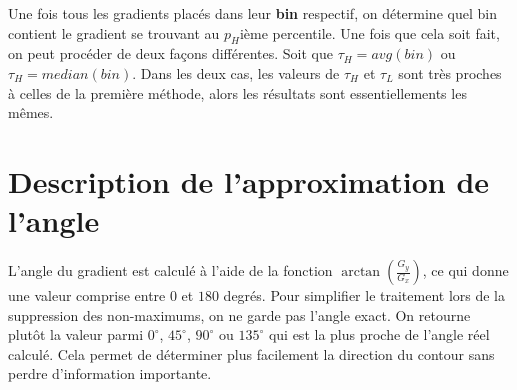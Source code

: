 \documentclass{article}
\begin{document}
Une fois tous les gradients placés dans leur \textbf{bin} respectif, on détermine quel bin contient
le gradient se trouvant au $p_H$ième percentile. Une fois que cela soit fait, on peut procéder de deux façons différentes. Soit que $\tau_H = avg(bin)$ ou 
$\tau_H = median(bin)$. Dans les deux cas, les valeurs de $\tau_H$ et $\tau_L$ sont très proches à celles de la première méthode, alors les résultats sont 
essentiellements les mêmes.


\section*{Description de l’approximation de l’angle}

L’angle du gradient est calculé à l’aide de la fonction \(\arctan\left(\frac{G_y}{G_x}\right)\), ce qui donne une valeur comprise entre \(0\) et \(180\) degrés.  
Pour simplifier le traitement lors de la suppression des non-maximums, on ne garde pas l’angle exact.  
On retourne plutôt la valeur parmi \(0^\circ\), \(45^\circ\), \(90^\circ\) ou \(135^\circ\) qui est la plus proche de l’angle réel calculé.  
Cela permet de déterminer plus facilement la direction du contour sans perdre d’information importante.
\end{document}
